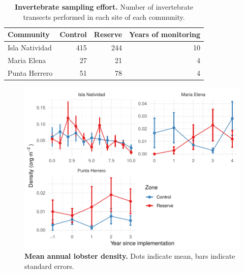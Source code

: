 \documentclass[10pt]{article}
\date{}
\begin{document}

{\Large
\textbf{}
}

\begin{table}[h]

\caption{\label{tab:}{\bf Invertebrate sampling effort.} Number of invertebrate transects performed in each site of each community.}
\centering
\begin{tabular}{lrrr}
\toprule
Community & Control & Reserve & Years of monitoring\\
\midrule
Isla Natividad & 415 & 244 & 10\\
Maria Elena & 27 & 21 & 4\\
Punta Herrero & 51 & 78 & 4\\
\bottomrule
\end{tabular}
\end{table}

\begin{figure}[h]
\centering
\includegraphics{img/S1_fig.pdf}
\caption{{\bf Mean annual lobster density.} Dots indicate mean, bars indicate standard errors.}
\end{figure}

\clearpage
\end{document}
